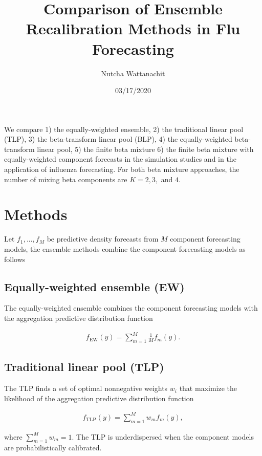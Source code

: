 \documentclass[
]{article}
\title{Comparison of Ensemble Recalibration Methods in Flu Forecasting}
\author{Nutcha Wattanachit}
\date{03/17/2020}
\begin{document}
\maketitle

We compare 1) the equally-weighted ensemble, 2) the traditional linear
pool (TLP), 3) the beta-transform linear pool (BLP), 4) the
equally-weighted beta-transform linear pool, 5) the finite beta mixture
6) the finite beta mixture with equally-weighted component forecasts in
the simulation studies and in the application of influenza forecasting.
For both beta mixture approaches, the number of mixing beta components
are \(K=2,3,\) and \(4\).

\hypertarget{methods}{%
\section{Methods}\label{methods}}

Let \(f_1,...,f_M\) be predictive density forecasts from \(M\) component
forecasting models, the ensemble methods combine the component
forecasting models as follows

\hypertarget{equally-weighted-ensemble-ew}{%
\subsection{Equally-weighted ensemble
(EW)}\label{equally-weighted-ensemble-ew}}

The equally-weighted ensemble combines the component forecasting models
with the aggregation predictive distribution function

\begin{align}
f_{\text{EW}}(y)=\sum_{m=1}^M \frac{1}{M}f_m(y).
\end{align}

\hypertarget{traditional-linear-pool-tlp}{%
\subsection{Traditional linear pool
(TLP)}\label{traditional-linear-pool-tlp}}

The TLP finds a set of optimal nonnegative weights \(w_i\) that maximize
the likelihood of the aggregation predictive distribution function

\begin{align}
f_{\text{TLP}}(y)=\sum_{m=1}^M w_mf_m(y),
\end{align}

where \(\sum_{m=1}^M w_m=1\). The TLP is underdispersed when the
component models are probabilistically calibrated.
\end{document}
